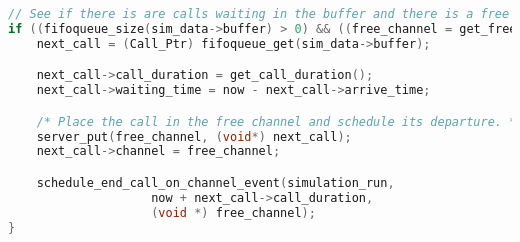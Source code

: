 \begin{lstlisting}[language=c,caption=Wait on Call Departure, label=list:exp5_departure]
// See if there is are calls waiting in the buffer and there is a free channel. If so, take the next one out and connect it immediately.
if ((fifoqueue_size(sim_data->buffer) > 0) && ((free_channel = get_free_channel(simulation_run)) != NULL)) {
	next_call = (Call_Ptr) fifoqueue_get(sim_data->buffer);

	next_call->call_duration = get_call_duration();
	next_call->waiting_time = now - next_call->arrive_time;

	/* Place the call in the free channel and schedule its departure. */
	server_put(free_channel, (void*) next_call);
	next_call->channel = free_channel;

	schedule_end_call_on_channel_event(simulation_run,
					now + next_call->call_duration,
					(void *) free_channel);
}
\end{lstlisting}